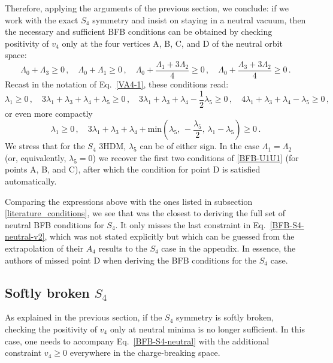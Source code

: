 \documentclass[11pt]{article}
\begin{document}
Therefore, applying the arguments of the previous section, we conclude:
if we work with the exact $S_4$ symmetry and insist on staying in a neutral vacuum, 
then the necessary and sufficient BFB conditions can be obtained
by checking positivity of $v_4$ only at the four vertices A, B, C, and D of the neutral orbit space:
\begin{equation}
\Lambda_0 + \Lambda_3 \ge 0\,, \quad \Lambda_0 + \Lambda_1 \ge 0\,, \quad 
\Lambda_0 + \frac{\Lambda_1 + 3\Lambda_2}{4} \ge 0\,, \quad \Lambda_0 + \frac{\Lambda_3 + 3\Lambda_2}{4} \ge 0\,. 
\label{BFB-S4-neutral}
\end{equation}
Recast in the notation of Eq.~\eqref{VA4-1}, these conditions read:
\begin{equation}
\lambda_1 \ge 0\,, \quad 
3\lambda_1 + \lambda_3 + \lambda_4 + \lambda_5 \ge 0\,,\quad 
3\lambda_1 + \lambda_3 + \lambda_4 -\frac{1}{2} \lambda_5 \ge 0\,,\quad 
4\lambda_1 + \lambda_3 + \lambda_4 - \lambda_5 \ge 0\,,
\label{BFB-S4-neutral-v2}
\end{equation}
or even more compactly 
\begin{equation}
\lambda_1 \ge 0\,, \quad 
3\lambda_1 + \lambda_3 + \lambda_4 + \mathrm{min}\left(\lambda_5,\, -\frac{\lambda_5}{2},\, \lambda_1 - \lambda_5\right) \ge 0\,.
\label{BFB-S4-neutral-v3}
\end{equation}
We stress that for the $S_4$ 3HDM, $\lambda_5$ can be of either sign.
In the case $\Lambda_1 = \Lambda_2$ (or, equivalently, $\lambda_5 = 0$) 
we recover the first two conditions of \eqref{BFB-U1U1} (for points A, B, and C),
after which the condition for point D is satisfied automatically.

Comparing the expressions above with the ones listed in subsection \ref{literature_conditions},
we see that \cite{Pramanick:2017wry} was the closest to deriving the full set of neutral BFB conditions for $S_4$.
It only misses the last constraint in Eq.~\eqref{BFB-S4-neutral-v2}, which was not stated explicitly but
which can be guessed from the extrapolation of their $A_4$ results to the $S_4$ case in the appendix.
In essence, the authors of \cite{Pramanick:2017wry} missed point D when deriving the BFB conditions for the $S_4$ case.

\subsection{Softly broken $S_4$}

As explained in the previous section, 
if the $S_4$ symmetry is softly broken, checking the positivity of $v_4$ only at neutral minima is no longer sufficient.
In this case, one needs to accompany Eq.~\eqref{BFB-S4-neutral} with the additional constraint
$v_4 \ge 0$ everywhere in the charge-breaking space.
\end{document}
